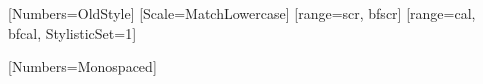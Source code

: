 [Numbers={OldStyle}]
\setsansfont{Libertinus Sans}
\setmonofont{Fira Mono}[Scale=MatchLowercase]
[range={scr, bfscr}]
[range={cal, bfcal}, StylisticSet=1]

\newfontfamily{}
\newfontfamily{}[Numbers={Monospaced}]
